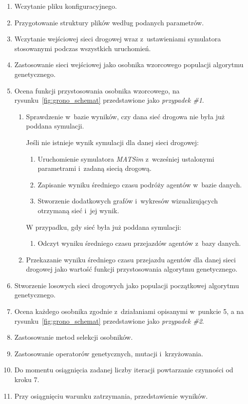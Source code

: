 \documentclass[twoside,12pt]{report}
\begin{document}
\begin{enumerate}
\item Wczytanie pliku konfiguracyjnego.
\item Przygotowanie struktury plików według podanych parametrów.
\item Wczytanie wejściowej sieci drogowej wraz z~ustawieniami symulatora stosowanymi podczas wszystkich uruchomień.
\item Zastosowanie sieci wejściowej jako osobnika wzorcowego populacji algorytmu genetycznego.
\item Ocena funkcji przystosowania osobnika wzorcowego, na rysunku~\ref{fig:grono_schemat} przedstawione jako \textit{przypadek \#1}.
\begin{enumerate}
\item Sprawdzenie w~bazie wyników, czy dana sieć drogowa nie była już poddana symulacji.

Jeśli nie istnieje wynik symulacji dla danej sieci drogowej:
\begin{enumerate}
\item Uruchomienie symulatora \textit{MATSim} z~wcześniej ustalonymi parametrami i~zadaną siecią drogową.
\item Zapisanie wyniku średniego czasu podróży agentów w~bazie danych.
\item Stworzenie dodatkowych grafów i~wykresów wizualizujących otrzymaną sieć i~jej wynik.
\end{enumerate}

W przypadku, gdy sieć była już poddana symulacji:
\begin{enumerate}
\item Odczyt wyniku średniego czasu przejazdów agentów z~bazy danych.
\end{enumerate}
\item Przekazanie wyniku średniego czasu przejazdu agentów dla danej sieci drogowej jako wartość funkcji przystosowania algorytmu genetycznego.
\end{enumerate}

\item Stworzenie losowych sieci drogowych jako populacji początkowej algorytmu genetycznego.
\item Ocena każdego osobnika zgodnie z~działaniami opisanymi w~punkcie 5, a na rysunku~\ref{fig:grono_schemat} przedstawione jako \textit{przypadek \#2}.
\item Zastosowanie metod selekcji osobników.
\item Zastosowanie operatorów genetycznych, mutacji i~krzyżowania.
\item Do momentu osiągnięcia zadanej liczby iteracji powtarzanie czynności od kroku 7.
\item Przy osiągnięciu warunku zatrzymania, przedstawienie wyników.
\end{enumerate}
\end{document}
